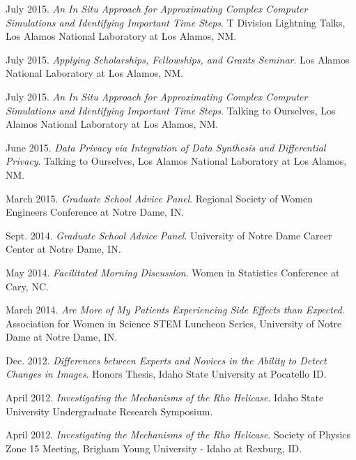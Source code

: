 \documentclass[11pt, letterpaper, roman]{moderncv} %
\begin{document}
\begin{etaremune}[topsep=0pt, itemsep=5pt, partopsep=0pt, parsep=0pt]
  \item July 2015. \textit{An In Situ Approach for Approximating Complex Computer Simulations and Identifying Important Time Steps}. T Division Lightning Talks, Los Alamos National Laboratory at Los Alamos, NM.
  
  \item July 2015. \textit{Applying Scholarships, Fellowships, and Grants Seminar}. Los Alamos National Laboratory at Los Alamos, NM.
  
  \item July 2015. \textit{An In Situ Approach for Approximating Complex Computer Simulations and Identifying Important Time Steps}. Talking to Ourselves, Los Alamos National Laboratory at Los Alamos, NM.

  \item June 2015. \textit{Data Privacy via Integration of Data Synthesis and Differential Privacy}. Talking to Ourselves, Los Alamos National Laboratory at Los Alamos, NM. 
  
  \item March 2015. \textit{Graduate School Advice Panel}.  Regional Society of Women Engineers Conference at Notre Dame, IN.
  
  \item Sept. 2014. \textit{Graduate School Advice Panel}.  University of Notre Dame Career Center at Notre Dame, IN.
  
  \item May 2014. \textit{Facilitated Morning Discussion}. Women in Statistics Conference at Cary, NC.
  
  \item March 2014. \textit{Are More of My Patients Experiencing Side Effects than Expected}. Association for Women in Science STEM Luncheon Series, University of Notre Dame at Notre Dame, IN.
  
  \item Dec. 2012. \textit{Differences between Experts and Novices in the Ability to Detect Changes in Images}. Honors Thesis, Idaho State University at Pocatello ID.

  \item April 2012. \textit{Investigating the Mechanisms of the Rho Helicase}. Idaho State University Undergraduate Research Symposium.

  \item April 2012. \textit{Investigating the Mechanisms of the Rho Helicase}. Society of Physics Zone 15 Meeting, Brigham Young University - Idaho at Rexburg, ID.


\end{etaremune}
\end{document}
